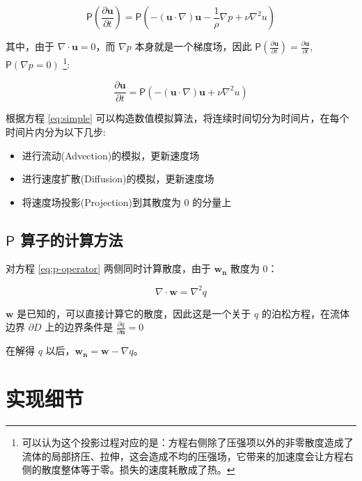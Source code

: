 \documentclass{ctexart}
\begin{document}
\begin{equation}
\mathsf{P}(\frac{\partial \mathbf{u}}{\partial t})
= \mathsf{P}(- (\mathbf{u} \cdot \nabla) \mathbf{u} - \frac{1}{\rho} \nabla p + \nu \nabla^2 u)
\end{equation}

其中，由于 $\nabla \cdot \mathbf{u} = 0$，而 $\nabla p$ 本身就是一个梯度场，因此 $\mathsf{P}(\frac{\partial \mathbf{u}}{\partial t}) = \frac{\partial \mathbf{u}}{\partial t}$, $\mathsf{P} (\nabla p = 0)$ \footnote{
  可以认为这个投影过程对应的是：方程右侧除了压强项以外的非零散度造成了流体的局部挤压、拉伸，这会造成不均的压强场，它带来的加速度会让方程右侧的散度整体等于零。损失的速度耗散成了热。
}:

\begin{equation}
\label{eq:simple}
\frac{\partial \mathbf{u}}{\partial t}
= \mathsf{P}(- (\mathbf{u} \cdot \nabla) \mathbf{u} + \nu \nabla^2 u)
\end{equation}

根据方程 \ref{eq:simple} 可以构造数值模拟算法，将连续时间切分为时间片，在每个时间片内分为以下几步:

\begin{itemize}
\item 进行流动(Advection)的模拟，更新速度场
\item 进行速度扩散(Diffusion)的模拟，更新速度场
\item 将速度场投影(Projection)到其散度为 0 的分量上
\end{itemize}

\subsection{$\mathsf{P}$ 算子的计算方法}
\label{sec:p-operator}
对方程 \ref{eq:p-operator} 两侧同时计算散度，由于 $\mathbf{w_n}$ 散度为 0：

\begin{equation}
\nabla \cdot \mathbf{w} = \nabla^2 q
\end{equation}

$\mathbf{w}$ 是已知的，可以直接计算它的散度，因此这是一个关于 $q$ 的泊松方程，在流体边界 $\partial D$ 上的边界条件是 $\frac{\partial q}{\partial \mathbf{n}} = 0$

在解得 $q$ 以后，$\mathbf{w_n} = \mathbf{w} - \nabla q$。

\section{实现细节}
\end{document}
